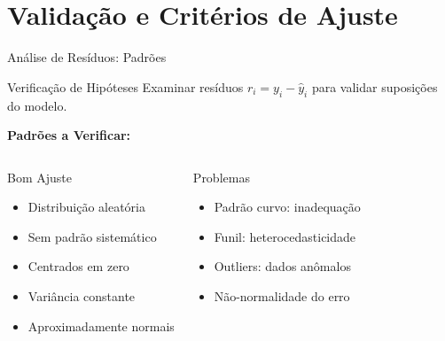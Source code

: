\section{Validação e Critérios de Ajuste}

\begin{frame}{Análise de Resíduos: Padrões}
\begin{block}{Verificação de Hipóteses}
Examinar resíduos $r_i = y_i - \hat{y}_i$ para validar suposições do modelo.
\end{block}

\textbf{Padrões a Verificar:}
\begin{columns}
\begin{exampleblock}{Bom Ajuste}\small
\begin{itemize}
    \item Distribuição aleatória
    \item Sem padrão sistemático
    \item Centrados em zero
    \item Variância constante
    \item Aproximadamente normais
\end{itemize}
\end{exampleblock}

\begin{alertblock}{Problemas}\small
\begin{itemize}
    \item Padrão curvo: inadequação
    \item Funil: heterocedasticidade
    \item Outliers: dados anômalos
    \item Não-normalidade do erro
\end{itemize}
\end{alertblock}
\end{columns}
\end{frame}

